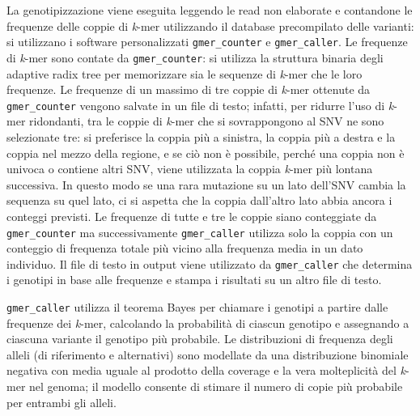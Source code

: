 \documentclass[../main.tex]{subfiles}
\begin{document}
\noindent
La genotipizzazione viene eseguita leggendo le read non elaborate e contandone le frequenze delle coppie di \textit{k}-mer utilizzando il database precompilato delle varianti: si utilizzano i software personalizzati \texttt{gmer\_counter} e \texttt{gmer\_caller}. Le frequenze di \textit{k}-mer sono contate da \texttt{gmer\_counter}: si utilizza la struttura binaria degli adaptive radix tree per memorizzare sia le sequenze di \textit{k}-mer che le loro frequenze. Le frequenze di un massimo di tre coppie di \textit{k}-mer ottenute da \texttt{gmer\_counter} vengono salvate in un file di testo; infatti, per ridurre l'uso di \textit{k}-mer ridondanti, tra le coppie di \textit{k}-mer che si sovrappongono al SNV ne sono selezionate tre: si preferisce la coppia più a sinistra, la coppia più a destra e la coppia nel mezzo della regione, e se ciò non è possibile, perché una coppia non è univoca o contiene altri SNV, viene utilizzata la coppia \textit{k}-mer più lontana successiva. In questo modo se una rara mutazione su un lato dell'SNV cambia la sequenza su quel lato, ci si aspetta che la coppia dall'altro lato abbia ancora i conteggi previsti. Le frequenze di tutte e tre le coppie siano conteggiate da \texttt{gmer\_counter} ma successivamente \texttt{gmer\_caller} utilizza solo la coppia con un conteggio di frequenza totale più vicino alla frequenza media in un dato individuo. Il file di testo in output viene utilizzato da \texttt{gmer\_caller} che determina i genotipi in base alle frequenze e stampa i risultati su un altro file di testo. 

\texttt{gmer\_caller} utilizza il teorema Bayes per chiamare i genotipi a partire dalle frequenze dei \textit{k}-mer, calcolando la probabilità di ciascun genotipo e assegnando a ciascuna variante il genotipo più probabile. Le distribuzioni di frequenza degli alleli (di riferimento e alternativi) sono modellate da una distribuzione binomiale negativa con media uguale al prodotto della coverage e la vera molteplicità del \textit{k}-mer nel genoma; il modello consente di stimare il numero di copie più probabile per entrambi gli alleli. 

\end{document}
